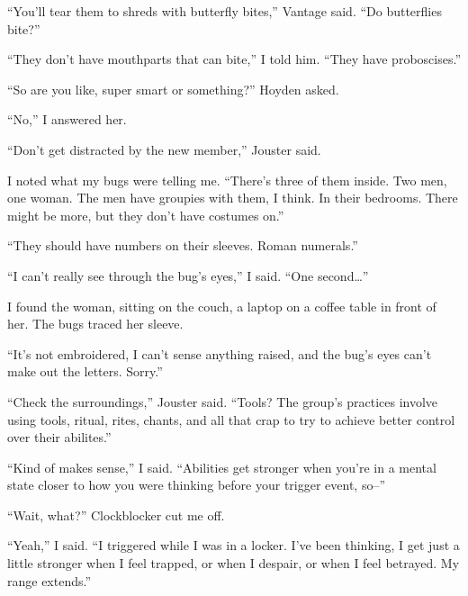 ``You'll tear them to shreds with butterfly bites,'' Vantage said.  ``Do butterflies bite?''



``They don't have mouthparts that can bite,'' I told him.  ``They have proboscises.''



``So are you like, super smart or something?'' Hoyden asked.



``No,'' I answered her.



``Don't get distracted by the new member,'' Jouster said.



I noted what my bugs were telling me.  ``There's three of them inside.  Two men, one woman.  The men have groupies with them, I think.  In their bedrooms.  There might be more, but they don't have costumes on.''



``They should have numbers on their sleeves.  Roman numerals.''



``I can't really see through the bug's eyes,'' I said.  ``One second\ldots''



I found the woman, sitting on the couch, a laptop on a coffee table in front of her.  The bugs traced her sleeve.



``It's not embroidered, I can't sense anything raised, and the bug's eyes can't make out the letters.  Sorry.''



``Check the surroundings,'' Jouster said.  ``Tools?  The group's practices involve using tools, ritual, rites, chants, and all that crap to try to achieve better control over their abilites.''



``Kind of makes sense,'' I said.  ``Abilities get stronger when you're in a mental state closer to how you were thinking before your trigger event, so--''



``Wait, what?''  Clockblocker cut me off.



``Yeah,'' I said.  ``I triggered while I was in a locker.  I've been thinking, I get just a little stronger when I feel trapped, or when I despair, or when I feel betrayed.  My range extends.''



